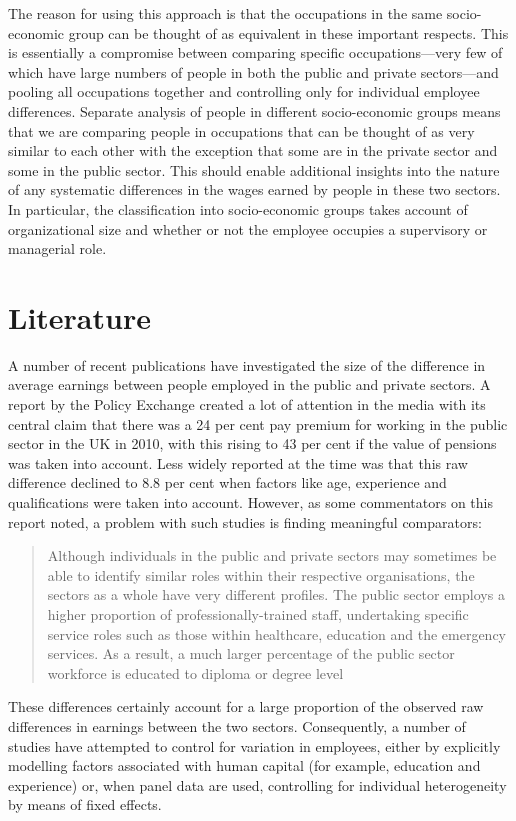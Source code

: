 \documentclass[a4paper,11pt,titlepage]{article}
\begin{document}
 The reason for using this approach is that the occupations in the same socio-economic group can be thought of as equivalent in these important respects. This is essentially a compromise between comparing specific occupations---very few of which have large numbers of people in both the public and private sectors---and pooling all occupations together and controlling only for individual employee differences.  Separate analysis of people in different socio-economic groups means that we are comparing people in occupations that can be thought of as very similar to each other with the exception that some are in the private sector and some in the public sector. This should enable additional insights into the nature of any systematic differences in the wages earned by people in these two sectors.  In particular, the classification into socio-economic groups takes account of organizational size and whether or not the employee occupies a supervisory or managerial role.

\section{Literature}
A number of recent publications have investigated the size of the difference in average earnings between people employed in the public and private sectors.  A report by the Policy Exchange \citep{Holmes2011} created a lot of attention in the media with its central claim that there was a 24 per cent pay premium for working in the public sector in the UK in 2010, with this rising to 43 per cent if the value of pensions was taken into account.  Less widely reported at the time was that this raw difference declined to 8.8 per cent when factors like age, experience and qualifications were taken into account.  However, as some commentators on this report noted, a problem with such studies is finding meaningful comparators:
\begin{quote}
    Although individuals in the public and private sectors may sometimes be able to identify similar roles within their respective organisations, the sectors as a whole have very different profiles. The public sector employs a higher proportion of professionally-trained staff, undertaking specific service roles such as those within healthcare, education and the emergency services. As a result, a much larger percentage of the public sector workforce is educated to diploma or degree level \citep[p.~13]{IDS2011}
\end{quote}
These differences certainly account for a large proportion of the observed raw differences in earnings between the two sectors.  Consequently, a number of studies have attempted to control for variation in employees, either by explicitly modelling factors associated with human capital (for example, education and experience) or, when panel data are used, controlling for individual heterogeneity by means of fixed effects.
\end{document}
